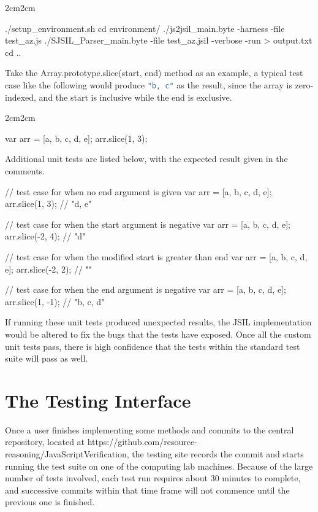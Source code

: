 \documentclass[a4paper,11pt,twoside]{report}
\def\jsinline{\lstinline[language=JavaScript, basicstyle=\small]}%\end{lstlisting}
\begin{document}
\begin{adjustwidth}{2cm}{2cm}
\begin{lstjs}
./setup_environment.sh
cd environment/
./js2jsil_main.byte -harness -file test_az.js
./SJSIL_Parser_main.byte -file test_az.jsil -verbose -run > output.txt
cd ..
\end{lstjs}
\end{adjustwidth}

Take the Array.prototype.slice(start, end) method as an example, a typical test case like the following would produce \jsinline|"b, c"| as the result, since the array is zero-indexed, and the start is inclusive while the end is exclusive.
\begin{adjustwidth}{2cm}{2cm}
\begin{lstjs}
var arr = [a, b, c, d, e];
arr.slice(1, 3);
\end{lstjs}
\end{adjustwidth}

Additional unit tests are listed below, with the expected result given in the comments.
\begin{adjustwidth}{2cm}{2cm}
\begin{lstjs}
// test case for when no end argument is given
var arr = [a, b, c, d, e];
arr.slice(1, 3); 
// "d, e"

// test case for when the start argument is negative
var arr = [a, b, c, d, e];
arr.slice(-2, 4); 
// "d"

// test case for when the modified start is greater than end
var arr = [a, b, c, d, e];
arr.slice(-2, 2); 
// ""

// test case for when the end argument is negative
var arr = [a, b, c, d, e];
arr.slice(1, -1); 
// "b, c, d"
\end{lstjs}
\end{adjustwidth}

If running these unit tests produced unexpected results, the JSIL implementation would be altered to fix the bugs that the tests have exposed. Once all the custom unit tests pass, there is high confidence that the tests within the standard test suite will pass as well.

\section{The Testing Interface}
Once a user finishes implementing some methods and commits to the central repository, located at https://github.com/resource-reasoning/JavaScriptVerification, the testing site records the commit and starts running the test suite on one of the computing lab machines. Because of the large number of tests involved, each test run requires about 30 minutes to complete, and successive commits within that time frame will not commence until the previous one is finished. 
\end{document}
